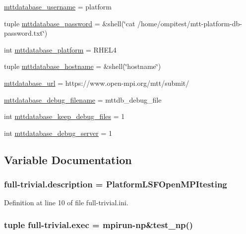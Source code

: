 \begin{DoxyCompactItemize}
$$\item 
\hyperlink{namespacefull-trivial_a2556ba8e56d9edb19b2a7dcff147fd83}{mttdatabase\-\_\-username} = platform
\item 
tuple \hyperlink{namespacefull-trivial_a00ca0a7632b4a85ca5df552bc984a77d}{mttdatabase\-\_\-password} = \&shell(\char`\"{}cat /home/ompitest/mtt-\/platform-\/db-\/password.\-txt\char`\"{})
\item 
int \hyperlink{namespacefull-trivial_a7435f3a6cf574a375aa8cb9b7b2fe162}{mttdatabase\-\_\-platform} = R\-H\-E\-L4
\item 
tuple \hyperlink{namespacefull-trivial_a774cf7cf721e8c1716122a628a72e4f8}{mttdatabase\-\_\-hostname} = \&shell(\char`\"{}hostname\char`\"{})
\item 
\hyperlink{namespacefull-trivial_a1e6b981d941fc6b728d6faae8632e225}{mttdatabase\-\_\-url} = https\-://www.\-open-\/mpi.\-org/mtt/submit/
\item 
\hyperlink{namespacefull-trivial_a5a952dcadcccb56251a2745399a467c5}{mttdatabase\-\_\-debug\-\_\-filename} = mttdb\-\_\-debug\-\_\-file
\item 
int \hyperlink{namespacefull-trivial_ad2a2564c1ae95fb67eda20314bac44f5}{mttdatabase\-\_\-keep\-\_\-debug\-\_\-files} = 1
\item 
int \hyperlink{namespacefull-trivial_a6ed803b39509a0e919f4f11063cb5209}{mttdatabase\-\_\-debug\-\_\-server} = 1
\end{DoxyCompactItemize}


\subsection{Variable Documentation}
\hypertarget{namespacefull-trivial_ad3a7f6605e8fa1721ffb53150f1b1f2b}{
\subsubsection[{description}]{\setlength{\rightskip}{0pt plus 5cm}full-\/trivial.\-description = Platform\-L\-S\-F\-Open\-M\-P\-Itesting}}\label{namespacefull-trivial_ad3a7f6605e8fa1721ffb53150f1b1f2b}


Definition at line 10 of file full-\/trivial.\-ini.

\hypertarget{namespacefull-trivial_a96c49e3c0c2dc3c6f9dbf27fe22ff837}{
\subsubsection[{exec}]{\setlength{\rightskip}{0pt plus 5cm}tuple full-\/trivial.\-exec = mpirun-\/{\bf np}\&test\-\_\-np()}}\label{namespacefull-trivial_a96c49e3c0c2dc3c6f9dbf27fe22ff837}


